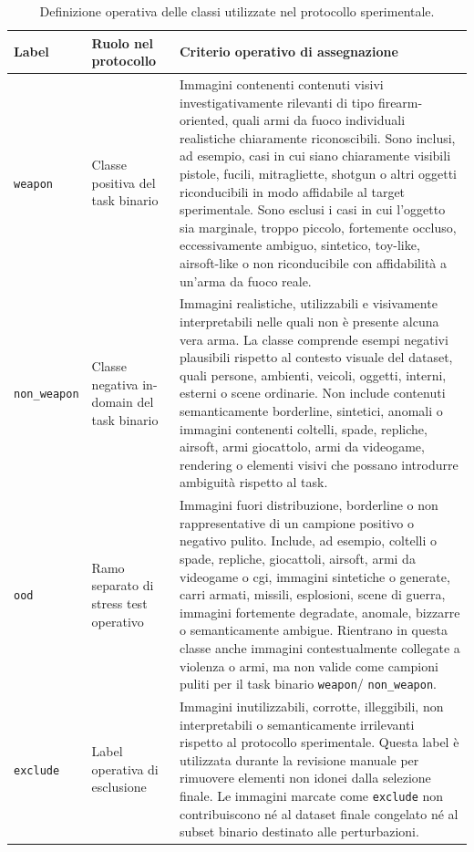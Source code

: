 \begin{table}[H]
\centering
\caption{Definizione operativa delle classi utilizzate nel protocollo sperimentale.}
\label{tab:methodology-operational-classes}
\begin{tabularx}{\textwidth}{@{}L{3.0cm}L{3.6cm}X@{}}
\toprule
\textbf{Label} & \textbf{Ruolo nel protocollo} & \textbf{Criterio operativo di assegnazione} \\
\midrule
\texttt{weapon}
&
Classe positiva del task binario
&
Immagini contenenti contenuti visivi investigativamente rilevanti di tipo
firearm-oriented, quali armi da fuoco individuali realistiche chiaramente
riconoscibili. Sono inclusi, ad esempio, casi in cui siano chiaramente visibili
pistole, fucili, mitragliette, shotgun o altri oggetti riconducibili in modo
affidabile al target sperimentale. Sono esclusi i casi in cui l'oggetto sia
marginale, troppo piccolo, fortemente occluso, eccessivamente ambiguo,
sintetico, toy-like, airsoft-like o non riconducibile con affidabilità a
un'arma da fuoco reale. \\

\texttt{non\_weapon}
&
Classe negativa in-domain del task binario
&
Immagini realistiche, utilizzabili e visivamente interpretabili nelle quali non
è presente alcuna vera arma. La classe comprende esempi negativi plausibili
rispetto al contesto visuale del dataset, quali persone, ambienti, veicoli,
oggetti, interni, esterni o scene ordinarie. Non include contenuti
semanticamente borderline, sintetici, anomali o immagini contenenti coltelli,
spade, repliche, airsoft, armi giocattolo, armi da videogame, rendering o
elementi visivi che possano introdurre ambiguità rispetto al task. \\
\texttt{ood}
&
Ramo separato di stress test operativo
&
Immagini fuori distribuzione, borderline o non rappresentative di un campione
positivo o negativo pulito. Include, ad esempio, coltelli o spade, repliche,
giocattoli, airsoft, armi da videogame o \gls{cgi}, immagini sintetiche o
generate, carri armati, missili, esplosioni, scene di guerra, immagini
fortemente degradate, anomale, bizzarre o semanticamente ambigue. Rientrano in
questa classe anche immagini contestualmente collegate a violenza o armi, ma
non valide come campioni puliti per il task binario \texttt{weapon}/
\texttt{non\_weapon}. \\
\texttt{exclude}
&
Label operativa di esclusione
&
Immagini inutilizzabili, corrotte, illeggibili, non interpretabili o
semanticamente irrilevanti rispetto al protocollo sperimentale. Questa label è
utilizzata durante la revisione manuale per rimuovere elementi non idonei dalla
selezione finale. Le immagini marcate come \texttt{exclude} non contribuiscono
né al dataset finale congelato né al subset binario destinato alle perturbazioni. \\
\bottomrule
\end{tabularx}
\end{table}


